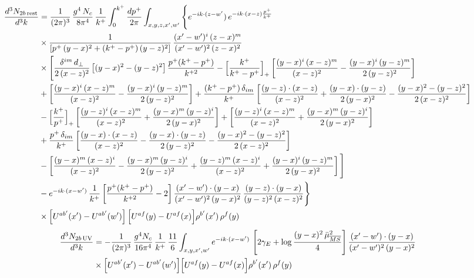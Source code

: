 \documentclass[9pt]{article}
\numberwithin{equation}{section}
\begin{document}
\begin{align}
\frac{d^{3}N_{2b\,\rm rest}}{d^{3}k} & =\frac{1}{(2\pi)^{3}}\,\frac{g^{4}\,N_{c}}{8\pi^{4}}\,\frac{1}{k^{+}}\int_{0}^{k^{+}}\frac{dp^{+}}{2\pi}\int_{x,y,z,x',w'}\Bigg\{e^{-ik\cdot(z-w'})\,e^{-ik\cdot(x-z)\frac{p^{+}}{k^{+}}}\notag \\ & \times\frac{1}{\left[p^{+}\,(y-x)^{2}+(k^{+}-p^{+})\,(y-z)^{2}\right]}\,\frac{(x'-w')^{i}\,(z-x)^{m}}{(x'-w')^{2}\,(z-x)^{2}}\notag\\
&\times\Bigg[\frac{\delta^{im}\,d_{\perp}}{2\,(x-z)^{2}}\left[(y-x)^{2}-(y-z)^{2}\right]\frac{p^{+}(k^{+}-p^{+})}{k^{+2}}
-\Big[\frac{k^{+}}{k^{+}-p^{+}}\Big]_{+}\left[\frac{(y-x)^{i}\,(x-z)^{m}}{(x-z)^{2}}-\frac{(y-x)^{i}\,(y-z)^{m}}{2\,(y-z)^{2}}\right]\notag\\
&+\left[\frac{(y-x)^{i}\,(x-z)^{m}}{(x-z)^{2}}-\frac{(y-x)^{i}\,(y-z)^{m}}{2\,(y-z)^{2}}\right]
+\frac{(k^{+}-p^{+})\,\delta_{im}}{k^{+}}\left[\frac{(y-z)\cdot(x-z)}{(x-z)^{2}}+\frac{(y-x)\cdot(y-z)}{2\,(y-x)^{2}}-\frac{(y-x)^{2}-(y-z)^{2}}{2\,(x-z)^{2}}\right]\notag\\
&-\Big[\frac{k^{+}}{p^{+}}\Big]_{+}\left[\frac{(y-z)^{i}\,(x-z)^{m}}{(x-z)^{2}}+\frac{(y-x)^{m}\,(y-z)^{i}}{2\,(y-x)^{2}}\right]+\left[\frac{(y-z)^{i}\,(x-z)^{m}}{(x-z)^{2}}+\frac{(y-x)^{m}\,(y-z)^{i}}{2\,(y-x)^{2}}\right]\notag\\
&+\frac{p^{+}\,\delta_{im}}{k^{+}}\left[\frac{(y-x)\cdot(x-z)}{(x-z)^{2}}-\frac{(y-x)\cdot(y-z)}{2\,(y-z)^{2}}-\frac{(y-x)^{2}-(y-z)^{2}}{2\,(x-z)^{2}}\right]\notag\\
&-\left[\frac{(y-x)^{m}\,(x-z)^{i}}{(x-z)^{2}}-\frac{(y-x)^{m}\,(y-z)^{i}}{2\,(y-z)^{2}}+\frac{(y-z)^{m}\,(x-z)^{i}}{(x-z)^{2}}+\frac{(y-x)^{i}\,(y-z)^{m}}{2\,(y-x)^{2}}\right]\Bigg]\notag\\
&-e^{-ik\cdot(x-w')}\,\frac{1}{k^{+}}\left[\frac{p^{+}(k^{+}-p^{+})}{k^{+2}}-2\right]\frac{(x'-w')\cdot(y-x)}{(x'-w')^{2}\,(y-x)^{2}}\,\frac{(y-z)\cdot(y-x)}{(y-z)^{2}\,(x-z)^{2}}\Bigg\}\notag\\
&\times\Big[U^{ab'}(x')-U^{ab'}(w')\Big]\,\Big[U^{af}(y)-U^{af}(x)\Big]\rho^{b'}(x')\,\rho^{f}(y)
\end{align} 
\begin{align} \frac{d^{3}N_{2b\,\rm UV}}{d^{3}k} & =-\frac{1}{(2\pi)^{3}}\,\frac{g^{4}N_{c}}{16\pi^{4}}\,\frac{1}{k^{+}}\,\frac{11}{6}\int_{x,y,x',w'}e^{-ik\cdot(x-w')}\,\left[2\gamma_{E}+\log\frac{(y-x)^{2}\,\bar\mu^{2}_{\overline{MS}}}{4}\right]\frac{(x'-w')\cdot(y-x)}{(x'-w')^{2}\,(y-x)^{2}}\notag \\ & \times\Big[U^{ab'}(x')-U^{ab'}(w')\Big]\Big[U^{af}(y)-U^{af}(x)\Big]\rho^{b'}(x')\,\rho^{f}(y)
\end{align}
\end{document}
